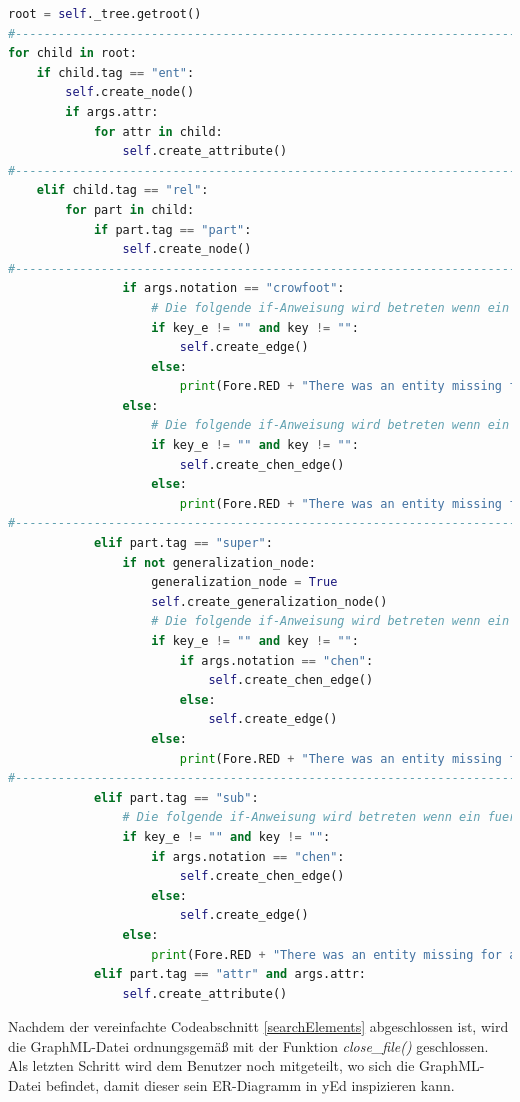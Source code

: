 \begin{lstlisting}[language=Python, label={searchElements}, caption={Vereinfachter Code zum hizufügen der Entity- und Beziehungstypen}]
root = self._tree.getroot()
#------------------------------------------------------------------------------------------------------
for child in root:
	if child.tag == "ent":
		self.create_node()
		if args.attr:
			for attr in child:
				self.create_attribute()
#------------------------------------------------------------------------------------------------------
	elif child.tag == "rel":
		for part in child:
			if part.tag == "part":
				self.create_node()
#------------------------------------------------------------------------------------------------------
				if args.notation == "crowfoot":
					# Die folgende if-Anweisung wird betreten wenn ein fuer beide Kantenenden ein Knoten definiert ist
					if key_e != "" and key != "":
						self.create_edge()
					else:
						print(Fore.RED + "There was an entity missing for a relationship" + Fore.RESET)
				else:
					# Die folgende if-Anweisung wird betreten wenn ein fuer beide Kantenenden ein Knoten definiert ist
					if key_e != "" and key != "":
						self.create_chen_edge()
					else:
						print(Fore.RED + "There was an entity missing for a relationship" + Fore.RESET)
#------------------------------------------------------------------------------------------------------
			elif part.tag == "super":
				if not generalization_node:
					generalization_node = True
					self.create_generalization_node()
					# Die folgende if-Anweisung wird betreten wenn ein fuer beide Kantenenden ein Knoten definiert ist
					if key_e != "" and key != "":
						if args.notation == "chen":
							self.create_chen_edge()
						else:
							self.create_edge()
					else:
						print(Fore.RED + "There was an entity missing for a relationship" + Fore.RESET)
#------------------------------------------------------------------------------------------------------
			elif part.tag == "sub":
				# Die folgende if-Anweisung wird betreten wenn ein fuer beide Kantenenden ein Knoten definiert ist
				if key_e != "" and key != "":
					if args.notation == "chen":
						self.create_chen_edge()
					else:
						self.create_edge()
				else:
					print(Fore.RED + "There was an entity missing for a relationship" + Fore.RESET)
			elif part.tag == "attr" and args.attr:
				self.create_attribute()
\end{lstlisting}
\prc

\noindent
Nachdem der vereinfachte Codeabschnitt \ref{searchElements} abgeschlossen ist, wird die GraphML-Datei ordnungsgemäß mit der Funktion \textit{close\_file()} geschlossen. Als letzten Schritt wird dem Benutzer noch mitgeteilt, wo sich die GraphML-Datei befindet, damit dieser sein ER-Diagramm in yEd inspizieren kann.




